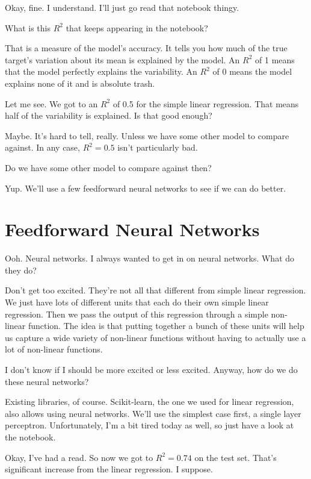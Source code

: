 {\color{blue} Okay, fine. I understand. I'll just go read that notebook thingy.

What is this $R^2$ that keeps appearing in the notebook?}

That is a measure of the model's accuracy. It tells you how much of the true target's variation about its mean is explained by the model. An $R^2$ of 1 means that the model perfectly explains the variability. An $R^2$ of 0 means the model explains none of it and is absolute trash. 

{\color{blue} Let me see. We got to an $R^2$ of 0.5 for the simple linear regression. That means half of the variability is explained. Is that good enough?}

Maybe. It's hard to tell, really. Unless we have some other model to compare against. In any case, $R^2=0.5$ isn't particularly bad. 

{\color{blue} Do we have some other model to compare against then?}

Yup. We'll use a few feedforward neural networks to see if we can do better.




\section{Feedforward Neural Networks}

{\color{blue} Ooh. Neural networks. I always wanted to get in on neural networks. What do they do?}

Don't get too excited. They're not all that different from simple linear regression. We just have lots of different units that each do their own simple linear regression. Then we pass the output of this regression through a simple non-linear function. The idea is that putting together a bunch of these units will help us capture a wide variety of non-linear functions without having to actually use a lot of non-linear functions. 

{\color{blue} I don't know if I should be more excited or less excited. Anyway, how do we do these neural networks?}

Existing libraries, of course. Scikit-learn, the one we used for linear regression, also allows using neural networks. We'll use the simplest case first, a single layer perceptron. Unfortunately, I'm a bit tired today as well, so just have a look at the notebook.

{\color{blue} Okay, I've had a read. So now we got to $R^2=0.74$ on the test set. That's significant increase from the linear regression. I suppose. }

